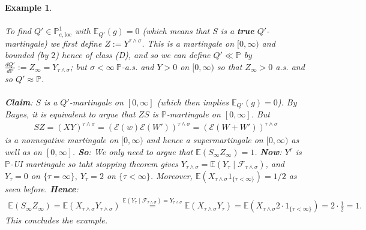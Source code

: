 \documentclass[12pt,a4paper, twoside]{article}
\newtheorem{exmp}{Example}[section]
\theoremstyle{definition}
\newcommand{\EE}{\mathbb{E}} %
\newcommand{\PP}{\mathbb{P}} %
\begin{document}
\begin{exmp}
\\\\
To find $Q' \in \PP_{e, \text{loc}}^1$ with $\EE_{Q'}(g)=0$ (which means that $S$ is a \textbf{true} $Q'$-martingale) we first define $Z:= Y^{ \tau \wedge \sigma}$. This is a martingale on $[0, \infty)$ and bounded (by $2$) hence of class (D), and so we can define $Q' \ll \PP$ by $\frac{dQ'}{d \PP}:= Z_\infty = Y_{\tau \wedge \sigma}$; but $\sigma < \infty \ \PP$-a.s. and $Y>0$ on $[0, \infty)$ so that $Z_\infty>0$ a.s. and so $Q' \approx \PP$. 
\\\\
\textbf{Claim}: $S$ is a $Q'$-martingale on $[0, \infty]$ (which then implies $\EE_{Q'}(g)=0$). By Bayes, it is equivalent to argue that $ZS$ is $\PP$-martingale on $[0, \infty]$. But 
\begin{align*}
SZ = (XY)^{ \tau \wedge \sigma} = ( \mathcal{E}(w) \mathcal{E}(W'))^{ \tau \wedge \sigma} = ( \mathcal{E}( W + W'))^{ \tau \wedge \sigma}
\end{align*}
is a nonnegative martingale on $[0, \infty)$ and hence a supermartingale on $[0, \infty)$ as well as on $[0, \infty]$. \textbf{So}: We only need to argue that $\EE(S_\infty Z_\infty)=1$. 
\newpage
\textbf{Now}: $Y^\tau$ is $\PP$-UI martingale so taht stopping theorem gives $Y_{ \tau \wedge \sigma} = \EE( Y_\tau \mid \mathcal{F}_{\tau \wedge \sigma})$, and $Y_\tau =0$ on $\{ \tau = \infty\}, \ Y_\tau =2$ on $\{ \tau < \infty\}$. Moreover, $\EE( X_{ \tau \wedge \sigma} 1_{\{ \tau < \infty\}} ) = 1/2$ as seen before. \textbf{Hence}:  
\begin{align*}
\EE( S_\infty Z_\infty) = \EE( X_{ \tau \wedge \sigma} Y_{ \tau \wedge \sigma}) \overset{ \EE(Y_\tau \mid \mathcal{F}_{ \tau \wedge \sigma})= Y_{ \tau \wedge \sigma}}= \EE( X_{ \tau \wedge \sigma} Y_\tau ) = \EE( X_{ \tau \wedge \sigma} 2 \cdot 1_{\{ \tau < \infty\}}) = 2 \cdot \frac{1}{2}=1. 
\end{align*}
This concludes the example. 
\end{exmp}
\newpage
\end{document}
